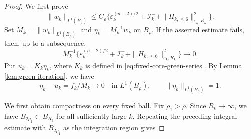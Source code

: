 \documentclass[11pt]{article}
\numberwithin{equation}{section}
\theoremstyle{remark}
\begin{document}
 \begin{proof}
We first prove
{
\[
 \|w_k\|_{L^1(B_\rho)}
 \le C_\rho\big\{
 \varepsilon_k^{(n-2)/2}+\mathcal I_k^-
 +\|H_{k,\le6}\|_{\varepsilon_k,R_k}^2\big\}.
\]
}
 Set $M_k=\|w_k\|_{L^1(B_\rho)}$ and $\eta_k=M_k^{-1}w_k$ on $B_\rho$.
If the asserted estimate fails, then, up to a subsequence,
 {
\[
 M_k^{-1}\big\{
 \varepsilon_k^{(n-2)/2}+\mathcal I_k^-
 +\|H_{k,\le6}\|_{\varepsilon_k,R_k}^2\big\}
 \to0.
\]
}
 Put $u_k=K_k\eta_k$, where $K_k$ is defined in \eqref{eq:fixed-core-green-series}.  
By Lemma  \ref{lem:green-iteration}, we have
{
\[
 \eta_k-u_k = f_k/M_k\to0\quad\text{in }L^1(B_\rho),
 \qquad \|\eta_k\|_{L^1(B_\rho)}=1.
\]
}

 We first obtain compactness on every fixed ball.  Fix $\rho_1>\rho$.
Since $R_k\to\infty$, we have $B_{2\rho_1}\subset B_{R_k}$ for all
sufficiently large $k$.  Repeating the preceding integral estimate with
$B_{2\rho_1}$ as the integration region gives


\end{proof}
\end{document}

